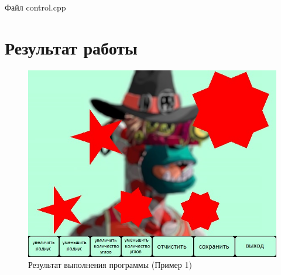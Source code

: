 \documentclass[14pt, a4paper]{extreport}
\begin{document}
\noindent Файл control.cpp


\chapter{Результат работы}

\begin{figure}[h!]
	\centering
	\includegraphics[width = 12cm]{image/image}
  \caption{Результат выполнения программы (Пример 1)}
\end{figure}


\end{document}
